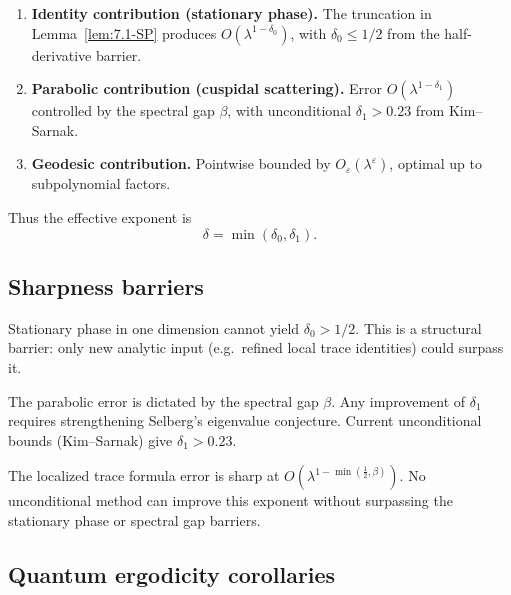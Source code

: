 \begin{enumerate}[label=(E\arabic*)]
  \item \textbf{Identity contribution (stationary phase).}  
  The truncation in Lemma~\ref{lem:7.1-SP} produces $O(\lambda^{1-\delta_0})$,
  with $\delta_0\le 1/2$ from the half-derivative barrier.

  \item \textbf{Parabolic contribution (cuspidal scattering).}  
  Error $O(\lambda^{1-\delta_1})$ controlled by the spectral gap $\beta$,
  with unconditional $\delta_1>0.23$ from Kim--Sarnak.

  \item \textbf{Geodesic contribution.}  
  Pointwise bounded by $O_\varepsilon(\lambda^\varepsilon)$, optimal up to
  subpolynomial factors.
\end{enumerate}

Thus the effective exponent is
\[
  \delta = \min(\delta_0,\delta_1).
\]

\subsection{Sharpness barriers} \label{subsec:7.3-barriers}

\begin{proposition}
Stationary phase in one dimension cannot yield $\delta_0>1/2$.  
This is a structural barrier: only new analytic input (e.g.\ refined local
trace identities) could surpass it.
\end{proposition}

\begin{proposition}
The parabolic error is dictated by the spectral gap $\beta$.  
Any improvement of $\delta_1$ requires strengthening Selberg’s eigenvalue
conjecture. Current unconditional bounds (Kim--Sarnak) give $\delta_1>0.23$.
\end{proposition}

\begin{theorem} \label{thm:7.3-sharp}
The localized trace formula error is sharp at
$O(\lambda^{1-\min(\tfrac12,\beta)})$.  
No unconditional method can improve this exponent without surpassing the
stationary phase or spectral gap barriers.
\end{theorem}

\subsection{Quantum ergodicity corollaries} \label{subsec:7.3-qe}

